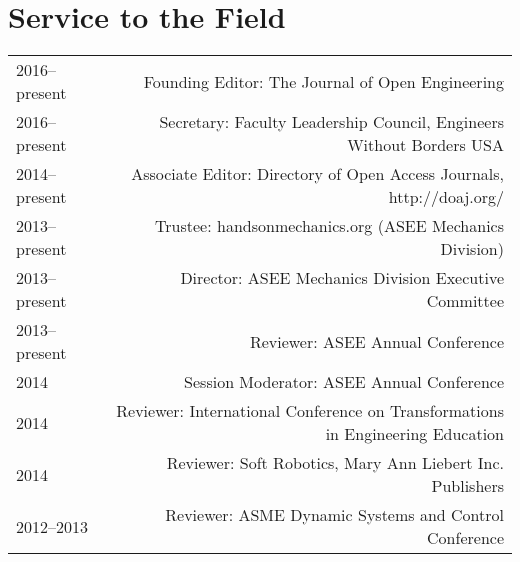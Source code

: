 \section*{Service to the Field}
\begin{tabular}{L!{\VRule}R}
2016--present&Founding Editor: The Journal of Open Engineering\\
2016--present&Secretary: Faculty Leadership Council, Engineers Without Borders USA\\
2014--present&Associate Editor: Directory of Open Access Journals, http://doaj.org/\\
2013--present&Trustee: handsonmechanics.org (ASEE Mechanics Division)\\
2013--present&Director: ASEE Mechanics Division Executive Committee\\
2013--present&Reviewer: ASEE Annual Conference\\
2014&Session Moderator: ASEE Annual Conference\\
2014&Reviewer: International Conference on Transformations in Engineering Education\\
2014&Reviewer: Soft Robotics, Mary Ann Liebert Inc. Publishers\\
2012--2013&Reviewer: ASME Dynamic Systems and Control Conference\\
\end{tabular}